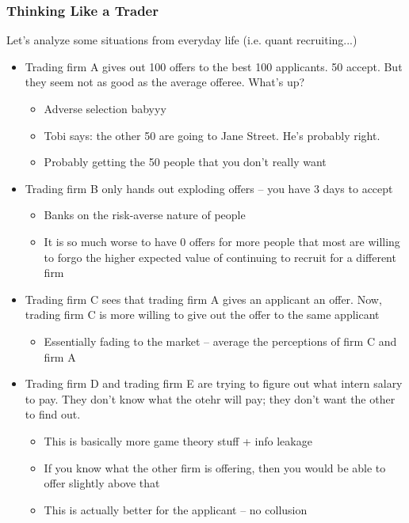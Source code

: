 \subsubsection{Thinking Like a Trader}
Let's analyze some situations from everyday life (i.e. quant recruiting...)
\begin{itemize}
    \item Trading firm A gives out 100 offers to the best 100 applicants. 50 accept. But they seem not as good as the average offeree. What's up?
        \begin{itemize}
            \item Adverse selection babyyy
            \item Tobi says: the other 50 are going to Jane Street. He's probably right.
            \item Probably getting the 50 people that you don't really want
        \end{itemize}

    \item Trading firm B only hands out exploding offers -- you have 3 days to accept
        \begin{itemize}
            \item Banks on the risk-averse nature of people
            \item It is so much worse to have 0 offers for more people that most are willing to forgo the higher expected value of continuing to recruit for a different firm
        \end{itemize}

    \item Trading firm C sees that trading firm A gives an applicant an offer. Now, trading firm C is more willing to give out the offer to the same applicant
        \begin{itemize}
            \item Essentially fading to the market -- average the perceptions of firm C and firm A
        \end{itemize}
    \item Trading firm D and trading firm E are trying to figure out what intern salary to pay. They don't know what the otehr will pay; they don't want the other to find out.
        \begin{itemize}
            \item This is basically more game theory stuff + info leakage
            \item If you know what the other firm is offering, then you would be able to offer slightly above that
            \item This is actually better for the applicant -- no collusion
        \end{itemize}
\end{itemize}

